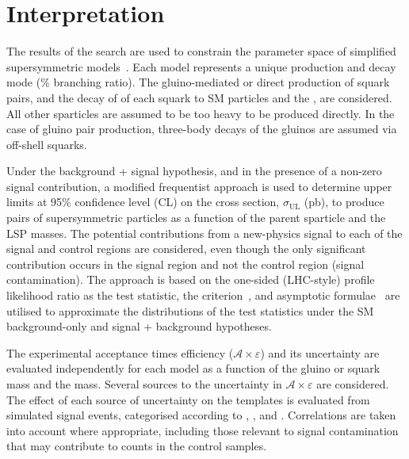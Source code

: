 \clearpage
\section{Interpretation}
\label{sec:interpretation}

The results of the search are used to constrain the parameter space of
simplified supersymmetric models~\cite{Alwall:2008ag, Alwall:2008va,
  sms}. Each model represents a unique production and decay mode (\% branching ratio). The gluino-mediated or direct production of
squark pairs, and the decay of of each squark to SM particles and the
\chiz, are considered. All other sparticles are assumed to be too
heavy to be produced directly. In the case of gluino pair production,
three-body decays of the gluinos are assumed via off-shell squarks.

Under the background + signal hypothesis, and in the presence of a
non-zero signal contribution, a modified frequentist approach is used
to determine upper limits at 95\% confidence level (CL) on the cross
section, $\sigma_\text{UL}$ (pb), to produce pairs of supersymmetric
particles as a function of the parent sparticle and the LSP
masses. The potential contributions from a new-physics signal to each
of the signal and control regions are considered, even though the only
significant contribution occurs in the signal region and not the
control region (\ie signal contamination). The approach is based on
the one-sided (LHC-style) profile likelihood ratio as the test
statistic, the \cls criterion~\cite{junk, read}, and asymptotic
formulae~\cite{Cowan:2010js} are utilised to approximate the
distributions of the test statistics under the SM background-only and
signal + background hypotheses. 

The experimental acceptance times efficiency
($\mathcal{A}\times\varepsilon$) and its uncertainty are evaluated
independently for each model as a function of the gluino or squark
mass and the \chiz mass. Several sources to the uncertainty in
$\mathcal{A}\times\varepsilon$ are considered. The effect of each
source of uncertainty on the \HTmiss templates is evaluated from
simulated signal events, categorised according to \njet, \nb, and
\scalht. Correlations are taken into account where appropriate,
including those relevant to signal contamination that may contribute
to counts in the control samples. 


